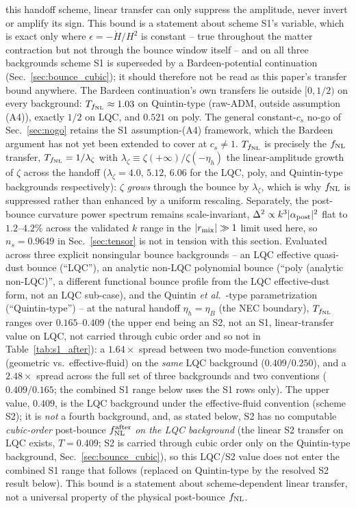 \documentclass[aps,prd,twocolumn,superscriptaddress,nofootinbib,longbibliography]{revtex4-2}
\newcommand{\fnl}{f_{\rm NL}}
\begin{document}
this handoff scheme, linear transfer can only suppress the amplitude, never
invert or amplify its sign. This bound is a statement about scheme S1's
variable, which is exact only where $\epsilon=-\dot H/H^2$ is constant --
true throughout the matter contraction but not through the bounce window
itself -- and on all three backgrounds scheme S1 is superseded by a
Bardeen-potential continuation (Sec.~\ref{sec:bounce_cubic}); it should
therefore not be read as this paper's transfer bound anywhere. The Bardeen
continuation's own transfers lie outside $[0,1/2)$ on every background:
$T_{\fnl}\approx1.03$ on Quintin-type (raw-ADM, outside assumption (A4)),
exactly $1/2$ on LQC, and $0.521$ on poly. The
general constant-$c_s$ no-go of Sec.~\ref{sec:nogo} retains the S1
assumption-(A4) framework, which the Bardeen argument has not yet been
extended to cover at $c_s\neq1$.
$T_{\fnl}$ is precisely the $f_{\rm NL}$
transfer, $T_{\fnl}=1/\lambda_\zeta$ with $\lambda_\zeta\equiv\zeta(+\infty)/\zeta(-\eta_h)$
the linear-amplitude growth of $\zeta$ across the handoff
($\lambda_\zeta=4.0$, $5.12$, $6.06$ for the LQC, poly, and Quintin-type
backgrounds respectively): $\zeta$ \emph{grows} through the bounce by
$\lambda_\zeta$, which is why $\fnl$ is suppressed rather than enhanced by a
uniform rescaling. Separately, the post-bounce curvature power spectrum
remains scale-invariant, $\Delta^2\propto k^3|\alpha_{\rm post}|^2$ flat to
$1.2$--$4.2\%$ across the validated $k$ range in the $|r_{\rm mix}|\gg1$ limit used
here, so $n_s=0.9649$ in Sec.~\ref{sec:tensor} is not in tension with this
section. Evaluated across three explicit nonsingular bounce
backgrounds -- an LQC effective quasi-dust bounce (``LQC''), an analytic
non-LQC polynomial bounce (``poly (analytic non-LQC)'', a different
functional bounce profile from the LQC effective-dust form, not an LQC
sub-case), and the Quintin \textit{et al.}~\cite{Quintin2015}-type
parametrization (``Quintin-type'') -- at
the natural handoff $\eta_h=\eta_B$ (the NEC boundary), $T_{\fnl}$ ranges over
$0.165$--$0.409$ (the upper end being an S2, not an S1, linear-transfer
value on LQC, not carried through cubic order and so not in
Table~\ref{tab:s1_after}): a $1.64\times$ spread between two mode-function conventions
(geometric vs.\ effective-fluid) on the \emph{same} LQC background
($0.409/0.250$), and a $2.48\times$ spread across the full set of three
backgrounds and two conventions ($0.409/0.165$; the combined S1 range below
uses the S1 rows only). The upper value, $0.409$, is
the LQC background under the effective-fluid convention (scheme S2); it is
\emph{not} a fourth background, and, as stated below, S2 has no computable
\emph{cubic-order} post-bounce $\fnl^{\rm after}$ \emph{on the LQC
background} (the linear S2 transfer on LQC exists, $T=0.409$; S2 is carried
through cubic order only on the Quintin-type background, Sec.~\ref{sec:bounce_cubic}),
so this LQC/S2 value does not enter the combined
S1 range that follows (replaced on Quintin-type by the resolved S2
result below). This bound is a statement
about scheme-dependent linear transfer, not a universal property of the
physical post-bounce $\fnl$.
\end{document}
